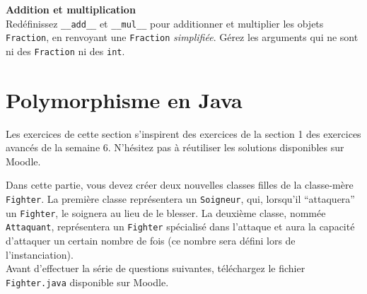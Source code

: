 \begin{Exercice}[15 minutes] \textbf{Addition et multiplication}\\
		Redéfinissez \lstinline{__add__} et \lstinline{__mul__} pour additionner et multiplier les objets \lstinline{Fraction}, en renvoyant une \lstinline{Fraction} \textit{simplifiée}. Gérez les arguments qui ne sont ni des \lstinline{Fraction} ni des \lstinline{int}.
\end{Exercice}

\begin{solution}
	
\end{solution}

\begin{solution}
	
\end{solution}

\begin{solution}
	
\end{solution}

\begin{solution}
	
\end{solution}

\section{Polymorphisme en Java}

Les exercices de cette section s'inspirent des exercices de la section 1 des exercices avancés de la semaine 6.
N'hésitez pas à réutiliser les solutions disponibles sur Moodle.

Dans cette partie, vous devez créer deux nouvelles classes filles de la classe-mère \lstinline{Fighter}. La première classe représentera un \lstinline{Soigneur}, qui, lorsqu'il ``attaquera'' un \lstinline{Fighter}, le soignera au lieu de le blesser. La deuxième classe, nommée \lstinline{Attaquant}, représentera un \lstinline{Fighter} spécialisé dans l'attaque et aura la capacité d'attaquer un certain nombre de fois (ce nombre sera défini lors de l'instanciation).\\

Avant d'effectuer la série de questions suivantes, téléchargez le fichier \lstinline{Fighter.java} disponible sur Moodle.\\

